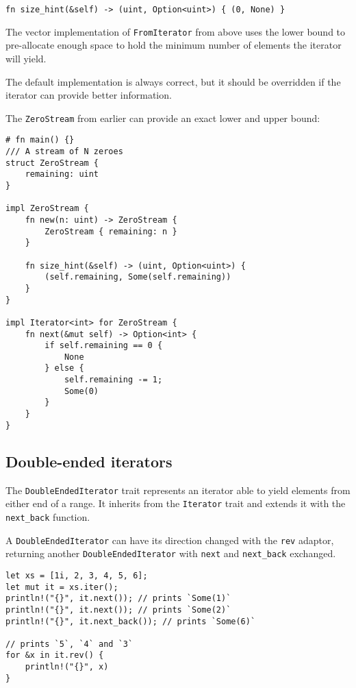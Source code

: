 \documentclass[]{article}
\begin{document}
\begin{verbatim}
fn size_hint(&self) -> (uint, Option<uint>) { (0, None) }
\end{verbatim}

The vector implementation of \texttt{FromIterator} from above uses the
lower bound to pre-allocate enough space to hold the minimum number of
elements the iterator will yield.

The default implementation is always correct, but it should be
overridden if the iterator can provide better information.

The \texttt{ZeroStream} from earlier can provide an exact lower and
upper bound:

\begin{verbatim}
# fn main() {}
/// A stream of N zeroes
struct ZeroStream {
    remaining: uint
}

impl ZeroStream {
    fn new(n: uint) -> ZeroStream {
        ZeroStream { remaining: n }
    }

    fn size_hint(&self) -> (uint, Option<uint>) {
        (self.remaining, Some(self.remaining))
    }
}

impl Iterator<int> for ZeroStream {
    fn next(&mut self) -> Option<int> {
        if self.remaining == 0 {
            None
        } else {
            self.remaining -= 1;
            Some(0)
        }
    }
}
\end{verbatim}

\subsection{Double-ended iterators}\label{double-ended-iterators}

The \texttt{DoubleEndedIterator} trait represents an iterator able to
yield elements from either end of a range. It inherits from the
\texttt{Iterator} trait and extends it with the \texttt{next\_back}
function.

A \texttt{DoubleEndedIterator} can have its direction changed with the
\texttt{rev} adaptor, returning another \texttt{DoubleEndedIterator}
with \texttt{next} and \texttt{next\_back} exchanged.

\begin{verbatim}
let xs = [1i, 2, 3, 4, 5, 6];
let mut it = xs.iter();
println!("{}", it.next()); // prints `Some(1)`
println!("{}", it.next()); // prints `Some(2)`
println!("{}", it.next_back()); // prints `Some(6)`

// prints `5`, `4` and `3`
for &x in it.rev() {
    println!("{}", x)
}
\end{verbatim}
\end{document}
